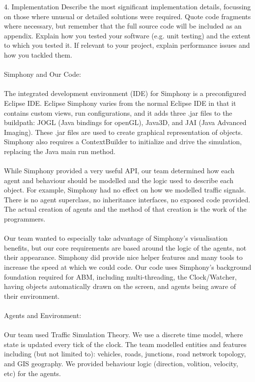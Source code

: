 \documentclass[11pt]{article}
\begin{document}
4. Implementation Describe the most significant implementation details, focussing on those where unusual or detailed solutions were required. Quote code fragments where necessary, but remember that the full source code will be included as an appendix. Explain how you tested your software (e.g. unit testing) and the extent to which you tested it. If relevant to your project, explain performance issues and how you tackled them. 
\\ \\

Simphony and Our Code:
\\ \\
The integrated development environment (IDE) for Simphony is a preconfigured Eclipse IDE. Eclipse Simphony varies from the normal Eclipse IDE in that it contains custom views, run configurations, and it adds three .jar files to the buildpath: JOGL (Java bindings for openGL), Java3D, and JAI (Java Advanced Imaging). These .jar files are used to create graphical representation of objects. Simphony also requires a ContextBuilder to initialize and drive the simulation, replacing the Java main run method. 
\\ \\
While Simphony provided a very useful API, our team determined how each agent and behaviour should be modelled and the logic used to describe each object. For example, Simphony had no effect on how we modelled traffic signals. There is no agent superclass, no inheritance interfaces, no exposed code provided. The actual creation of agents and the method of that creation is the work of the programmers. 
\\ \\
Our team wanted to especially take advantage of Simphony’s visualisation benefits, but our core requirements are based around the logic of the agents, not their appearance. Simphony did provide nice helper features and many tools to increase the speed at which we could code. Our code uses Simphony’s background foundation required for ABM, including multi-threading, the Clock/Watcher, having objects automatically drawn on the screen, and agents being aware of their environment.
\\ \\
Agents and Environment:
\\ \\
Our team used Traffic Simulation Theory. We use a discrete time model, where state is updated every tick of the clock. 
The team modelled entities and features including (but not limited to): vehicles, roads, junctions, road network topology, and GIS geography. We provided behaviour logic (direction, volition, velocity, etc) for the agents.
\end{document}
